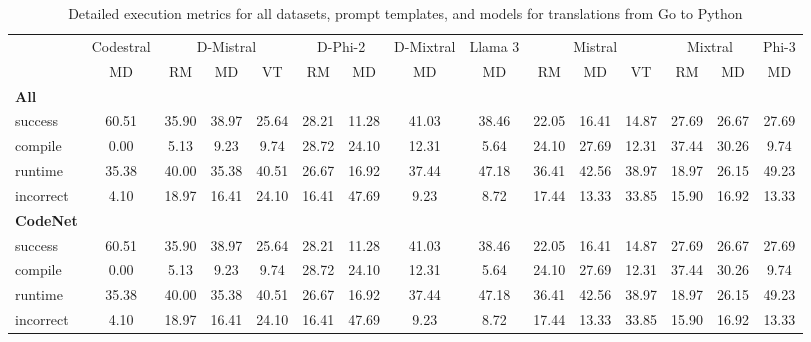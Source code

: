 \begin{table}[t]
\caption{Detailed execution metrics for all datasets, prompt templates, and models for translations from Go to Python}
\label{tab:iteration_1_stats_percent_Go_Python}

\setlength{\tabcolsep}{2.5pt} %
\renewcommand{\arraystretch}{1} %

\footnotesize
\begin{tabular}{@{}lcccccccccccccc@{}}
\toprule
 & Codestral & \multicolumn{3}{c}{D-Mistral} & \multicolumn{2}{c}{D-Phi-2} & D-Mixtral & Llama 3 & \multicolumn{3}{c}{Mistral}  & \multicolumn{2}{c}{Mixtral} & Phi-3 \\ 

\cmidrule(l){2-2}
\cmidrule(l){3-5}
\cmidrule(l){6-7}
\cmidrule(l){8-8}
\cmidrule(l){9-9}
\cmidrule(l){10-12}
\cmidrule(l){13-14}
\cmidrule(l){15-15}

& \multicolumn{1}{c}{MD}
& \multicolumn{1}{c}{RM}
& \multicolumn{1}{c}{MD}
& \multicolumn{1}{c}{VT}
& \multicolumn{1}{c}{RM}
& \multicolumn{1}{c}{MD} 
& \multicolumn{1}{c}{MD} 
& \multicolumn{1}{c}{MD} 
& \multicolumn{1}{c}{RM} 
& \multicolumn{1}{c}{MD} 
& \multicolumn{1}{c}{VT} 
& \multicolumn{1}{c}{RM}
& \multicolumn{1}{c}{MD} 
& \multicolumn{1}{c}{MD} \\

\midrule
\textbf{All} & & & & & & & & & & & & & & \\ 
\quad success & 60.51 & 35.90 & 38.97 & 25.64 & 28.21 & 11.28 & 41.03 & 38.46 & 22.05 & 16.41 & 14.87 & 27.69 & 26.67 & 27.69 \\
\qquad compile & 0.00 & 5.13 & 9.23 & 9.74 & 28.72 & 24.10 & 12.31 & 5.64 & 24.10 & 27.69 & 12.31 & 37.44 & 30.26 & 9.74 \\
\qquad runtime & 35.38 & 40.00 & 35.38 & 40.51 & 26.67 & 16.92 & 37.44 & 47.18 & 36.41 & 42.56 & 38.97 & 18.97 & 26.15 & 49.23 \\
\qquad incorrect & 4.10 & 18.97 & 16.41 & 24.10 & 16.41 & 47.69 & 9.23 & 8.72 & 17.44 & 13.33 & 33.85 & 15.90 & 16.92 & 13.33 \\
 

\textbf{CodeNet} & & & & & & & & & & & & & & \\ 
\quad success & 60.51 & 35.90 & 38.97 & 25.64 & 28.21 & 11.28 & 41.03 & 38.46 & 22.05 & 16.41 & 14.87 & 27.69 & 26.67 & 27.69 \\
\qquad compile & 0.00 & 5.13 & 9.23 & 9.74 & 28.72 & 24.10 & 12.31 & 5.64 & 24.10 & 27.69 & 12.31 & 37.44 & 30.26 & 9.74 \\
\qquad runtime & 35.38 & 40.00 & 35.38 & 40.51 & 26.67 & 16.92 & 37.44 & 47.18 & 36.41 & 42.56 & 38.97 & 18.97 & 26.15 & 49.23 \\
\qquad incorrect & 4.10 & 18.97 & 16.41 & 24.10 & 16.41 & 47.69 & 9.23 & 8.72 & 17.44 & 13.33 & 33.85 & 15.90 & 16.92 & 13.33 \\
 

\bottomrule
\end{tabular}
\end{table}




